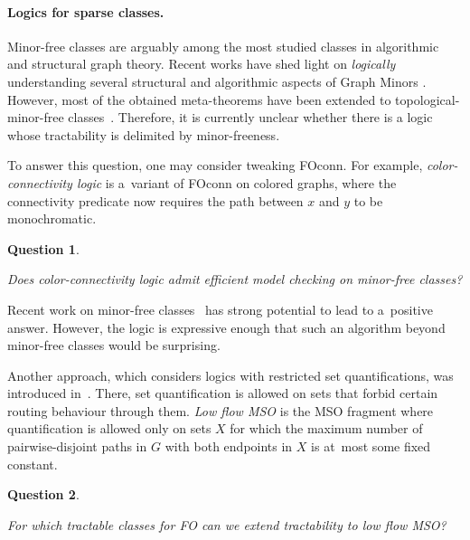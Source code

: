 \documentclass[a4paper,11pt]{article}
\newcommand{\fo}{\textsf{FO}\xspace}
\newcommand{\foconn}{\textsf{FO\text{+}conn}\xspace}
\newcommand{\mso}{\textsf{MSO}\xspace}
\newtheorem{quest}{Question}
\newenvironment{question}
  {\begin{quest}\begin{mdframed}[style=questionstyle]}
  {\end{mdframed}\end{quest}}
\begin{document}

\paragraph{Logics for sparse classes.}
Minor-free classes are arguably among the most studied classes in algorithmic and structural graph theory.
Recent works have shed light on \emph{logically} understanding several structural and algorithmic aspects of Graph Minors
\cite{GolovachST23,FominGSST24comp,SauST25para}. However, most of the obtained
meta-theorems have been extended to topological-minor-free classes~\cite{SchirrmacherSSTV24mode,SauSSSTV26}.
Therefore, it is currently unclear whether there is a logic whose tractability is delimited by minor-freeness. 

To answer this question, one may consider tweaking \foconn.
For example, \emph{color-connectivity logic} is a~variant of \foconn on colored graphs, where the connectivity predicate now requires the path between $x$ and $y$ to be monochromatic.

\begin{question}\label{q:color-conn}
    Does color-connectivity logic admit efficient model checking on minor-free classes?
\end{question}
Recent work on minor-free classes~\cite{BuffiereLNOS26char} has strong potential to lead to a~positive answer. 
However, the logic is expressive enough that such an algorithm beyond minor-free classes would be surprising.

\medskip

Another approach, which considers logics with restricted set quantifications, was introduced in~\cite{SauST25para}.
There, set quantification is allowed on sets that forbid certain routing behaviour through them.
\emph{Low flow \mso} is the \mso fragment where  quantification is allowed only on sets $X$ for which the maximum number of pairwise-disjoint paths in $G$ with both endpoints in $X$ is at~most some fixed constant.

\begin{question}\label{q:lfmso}
    For which tractable classes for \fo can we extend tractability to low flow \mso?
\end{question}
\end{document}
